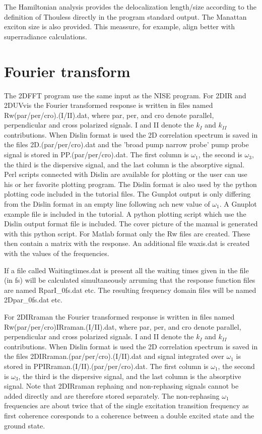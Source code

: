 The Hamiltonian analysis provides the delocalization length/size according to the
definition of Thouless \cite{Thouless.1974.PR.13.93} directly in the program standard
output. The Manattan exciton size is also provided. This meassure, for example,
align better with superradiance calculations. 

\section{Fourier transform \label{sec:Fourier}}
The 2DFFT program use the same input as the NISE program.
For 2DIR and 2DUVvis the Fourier transformed response is written in files named
Rw(par/per/cro).(I/II).dat, where par, per, and cro denote parallel, perpendicular
and cross polarized signals. I and II denote the $k_I$ and $k_{II}$ contributions.
When Dislin format is used the 2D correlation spectrum is saved in the files
2D.(par/per/cro).dat and the 'broad pump narrow probe' pump probe signal is stored
in PP.(par/per/cro).dat. The first column is $\omega_1$, the second is $\omega_3$, the
third is the dispersive signal, and the last column is the absorptive signal. Perl
scripts connected with Dislin are available for plotting or the user can use his or
her favorite plotting program. The Dislin format is also used by the python plotting
code included in the tutorial files. The Gunplot output is only differing from the
Dislin format in an empty line following ach new value of $\omega_1$. A Gnuplot
example file is included in the tutorial. A python plotting script which use the
Dislin output format file is included. The cover picture of the manual is generated
with this python script. For Matlab format only the Rw files are created. These
then contain a matrix with the response. An additional file waxis.dat is created
with the values of the frequencies.

If a file called Waitingtimes.dat is present all the waiting times given in the file
(in fs) will be calculated simultaneously arruming that the response function files
are named RparI\_0fs.dat etc. The resulting frequency domain files will be named
2Dpar\_0fs.dat etc.

For 2DIRraman the Fourier transformed response is written in files named\\
Rw(par/per/cro)IRraman.(I/II).dat, where par, per, and cro denote parallel,
perpendicular and cross polarized signals. I and II denote the $k_I$ and $k_{II}$
contributions. When Dislin format is used the 2D correlation spectrum is saved in
the files 2DIRraman.(par/per/cro).(I/II).dat and signal integrated over $\omega_1$
is stored in PPIRraman.(I/II).(par/per/cro).dat. The first column is $\omega_1$, the
second is $\omega_3$, the third is the dispersive signal, and the last column is
the absorptive signal. Note that 2DIRraman rephaing and non-rephasing signals cannot 
be added directly and are therefore stored separately. The non-rephasing $\omega_1$
frequencies are about twice that of the single excitation transition frequency as
first coherence coresponds to a coherence between a double excited state and the
ground state.
